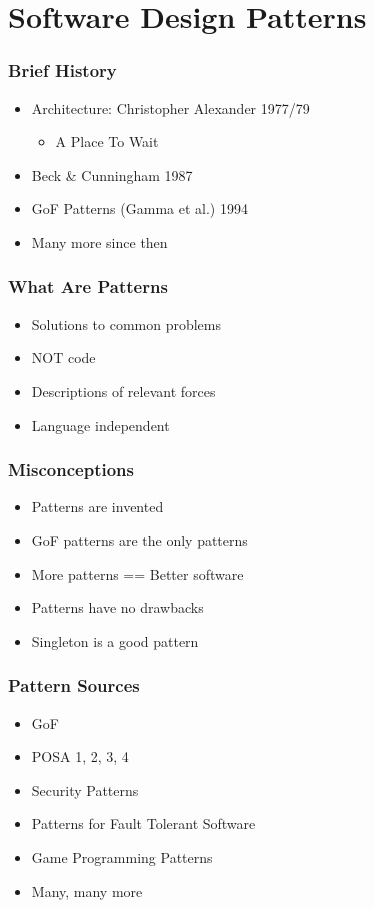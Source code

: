 \section{Software Design Patterns}

\begin{frame}
  \frametitle{Brief History}
  \begin{itemize}
    \item{Architecture: Christopher Alexander 1977/79}
      \begin{itemize}
        \item{A Place To Wait}
      \end{itemize}\pause{}
    \item{Beck \& Cunningham 1987}\pause{}
    \item{GoF Patterns (Gamma et al.) 1994}\pause{}
    \item{Many more since then}
  \end{itemize}
\end{frame}

\begin{frame}
  \frametitle{What Are Patterns}
  \begin{itemize}
    \item{Solutions to common problems}
    \item{NOT code}\pause{}
    \item{Descriptions of relevant forces}\pause{}
    \item{Language independent}
  \end{itemize}
\end{frame}

\begin{frame}
  \frametitle{Misconceptions}
  \begin{itemize}
    \item{Patterns are invented}\pause{}
    \item{GoF patterns are the only patterns}\pause{}
    \item{More patterns == Better software}\pause{}
    \item{Patterns have no drawbacks}\pause{}
    \item{Singleton is a good pattern}
  \end{itemize}
\end{frame}

\begin{frame}
  \frametitle{Pattern Sources}
  \begin{itemize}
    \item{GoF}\pause{}
    \item{POSA 1, 2, 3, 4}\pause{}
    \item{Security Patterns}\pause{}
    \item{Patterns for Fault Tolerant Software}\pause{}
    \item{Game Programming Patterns}\pause{}
    \item{Many, many more}
  \end{itemize}
\end{frame}


